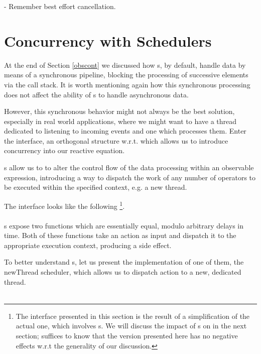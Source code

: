 - Remember best effort cancellation.

\section{Concurrency with Schedulers}

At the end of Section \ref{obscont} we discussed how s, by default, handle data by means of a synchronous pipeline, blocking the processing of successive elements via the call stack. It is worth mentioning again how this synchronous processing does not affect the ability of s to handle asynchronous data.

However, this synchronous behavior might not always be the best solution, especially in real world applications, where we might want to have a thread dedicated to listening to incoming events and one which processes them. Enter the  interface, an orthogonal\cite{wiki:orthogonality} structure w.r.t.  which allows us to introduce concurrency into our reactive equation. 

s allow us to to alter the control flow of the data processing within an observable expression, introducing a way to dispatch the work of any number of operators to be executed within the specified context, e.g. a new thread.

The  interface looks like the following \footnote{The interface presented in this section is the result of a simplification of the actual one, which involves s. We will discuss the impact of s on  in the next section; suffices to know that the version presented here has no negative effects w.r.t the generality of our discussion.}.\\

\\

s expose two functions which are essentially equal, modulo arbitrary delays in time. Both of these functions take an  action as input and dispatch it to the appropriate execution context, producing a side effect. 

To better understand s, let us present the implementation of one of them, the newThread scheduler, which allows us to dispatch action to a new, dedicated thread.\\

\\

